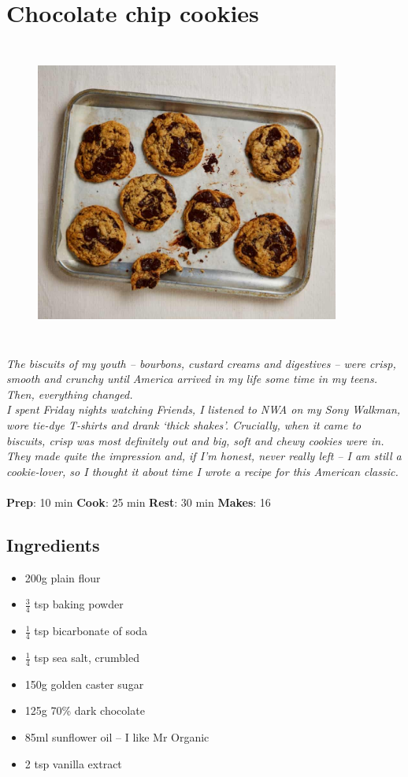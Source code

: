 \documentclass{book}
\begin{document}
\section{Chocolate chip cookies}
\begin{figure}
\centering\includegraphics[width=10cm,height=10cm,keepaspectratio]{Recipe_Pictures/Chocolate_chip_cookies.png}
\end{figure}
\emph{The biscuits of my youth – bourbons, custard creams and digestives – were crisp, smooth and crunchy until America arrived in my life some time in my teens. Then, everything changed. \\ 
I spent Friday nights watching Friends, I listened to NWA on my Sony Walkman, wore tie-dye T-shirts and drank ‘thick shakes’. Crucially, when it came to biscuits, crisp was most definitely out and big, soft and chewy cookies were in. They made quite the impression and, if I’m honest, never really left – I am still a cookie-lover, so I thought it about time I wrote a recipe for this American classic.}\\\\ 
\textbf{Prep}: 10 min
\textbf{Cook}: 25 min
\textbf{Rest}: 30 min
\textbf{Makes}: 16
\subsection*{Ingredients}
\begin{itemize}
\item 200g plain flour
\item $\frac{3}{4}$ tsp baking powder
\item $\frac{1}{4}$ tsp bicarbonate of soda
\item $\frac{1}{4}$ tsp sea salt, crumbled
\item 150g golden caster sugar
\item 125g 70\% dark chocolate
\item 85ml sunflower oil – I like Mr Organic
\item 2 tsp vanilla extract
\end{itemize}
\end{document}
